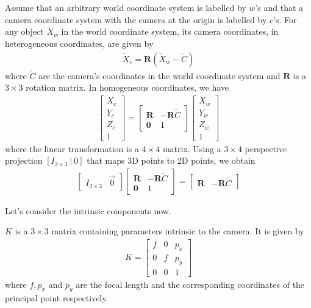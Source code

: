\documentclass[11pt]{article}
\begin{document}
Assume that an arbitrary world coordinate system is labelled by $w$'s and that a camera coordinate system with the camera at the origin is labelled by $c$'s. For any object $\tilde{X}_w$ in the world coordinate system, its camera coordinates, in heterogeneous coordinates, are given by 
\begin{align*}
    \tilde{X}_c = \mathbf{R} (\tilde{X}_w - \tilde{C})
\end{align*}
where $\tilde{C}$ are the camera's coordinates in the world coordinate system and $\mathbf{R}$ is a $3 \times 3$ rotation matrix. In homogeneous coordinates, we have 
\begin{align*}
    \begin{bmatrix}
        X_c \\ Y_c \\ Z_c \\ 1
    \end{bmatrix} = 
    \begin{bmatrix}
        \mathbf{R} & - \mathbf{R}\tilde{C} \\
        \mathbf{0} & 1 
    \end{bmatrix}
    \begin{bmatrix}
        X_w \\ Y_w \\ Z_w \\ 1
    \end{bmatrix}
\end{align*}
where the linear transformation is a $4\times 4$ matrix. Using a $3 \times 4$ perspective projection $[I_{3\times 3}~|~0]$ that maps 3D points to 2D points, we obtain 
\begin{align*}
    \begin{bmatrix}
        I_{3 \times 3} & \vec{0}
    \end{bmatrix}
    \begin{bmatrix}
        \mathbf{R} & - \mathbf{R}\tilde{C} \\
        \mathbf{0} & 1 
    \end{bmatrix} = 
    \begin{bmatrix}
        \mathbf{R} & - \mathbf{R} \tilde{C}
    \end{bmatrix}
\end{align*}

Let's consider the intrinsic components now. 

$K$ is a $3\times 3$ matrix containing parameters intrinsic to the camera. It is given by 
\begin{align*}
    K = 
    \begin{bmatrix}
        f & 0 & p_x \\ 0 & f & p_y \\ 0 & 0 & 1 
    \end{bmatrix}
\end{align*}
where $f, p_x$ and $p_y$ are the focal length and the corresponding coordinates of the principal point respectively. 
\end{document}
